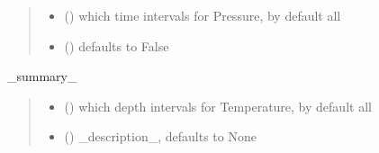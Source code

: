 \documentclass[letterpaper,10pt,english]{sphinxmanual}
\begin{document}
\begin{fulllineitems}
\begin{fulllineitems}
\begin{quote}
\begin{description}
\begin{itemize}
\item {} 
\sphinxAtStartPar
{} (\sphinxstyleliteralemphasis{\sphinxupquote{, }}) \textendash{} which time intervals for Pressure, by default all

\item {} 
\sphinxAtStartPar
{} (\sphinxstyleliteralemphasis{\sphinxupquote{, }}) \textendash{} defaults to False

\end{itemize}

\end{description}\end{quote}

\end{fulllineitems}


\begin{fulllineitems}
\label{\detokenize{tscw_module:tscw_module.tscw_DataClassesOutput.TSCW_TBHC.plot_tp_vs_time}}
\pysigstartsignatures
{}
\pysigstopsignatures
\sphinxAtStartPar
\_summary\_
\begin{quote}\begin{description}
\begin{itemize}
\item {} 
\sphinxAtStartPar
{} (\sphinxstyleliteralemphasis{\sphinxupquote{, }}) \textendash{} which depth intervals for Temperature, by default all

\item {} 
\sphinxAtStartPar
{} (\sphinxstyleliteralemphasis{\sphinxupquote{, }}) \textendash{} \_description\_, defaults to None


\end{itemize}
\end{description}
\end{quote}
\end{fulllineitems}
\end{fulllineitems}
\end{document}
